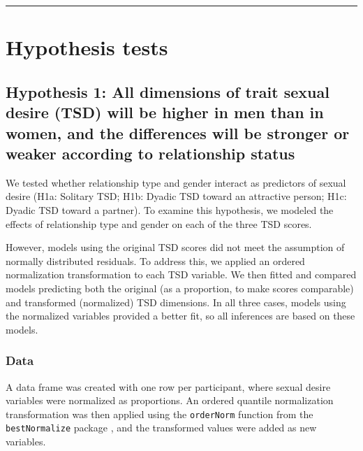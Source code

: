 \documentclass[
  bookmarksnumbered]{article}
\begin{document}
\begin{center}\rule{0.5\linewidth}{0.5pt}\end{center}

\section{Hypothesis tests}\label{hypothesis-tests}

\subsection{Hypothesis 1: All dimensions of trait sexual desire (TSD) will be higher in men than in women, and the differences will be stronger or weaker according to relationship status}\label{hyp1}

We tested whether relationship type and gender interact as predictors of sexual desire (H1a: Solitary TSD; H1b: Dyadic TSD toward an attractive person; H1c: Dyadic TSD toward a partner). To examine this hypothesis, we modeled the effects of relationship type and gender on each of the three TSD scores.

However, models using the original TSD scores did not meet the assumption of normally distributed residuals. To address this, we applied an ordered normalization transformation to each TSD variable. We then fitted and compared models predicting both the original (as a proportion, to make scores comparable) and transformed (normalized) TSD dimensions. In all three cases, models using the normalized variables provided a better fit, so all inferences are based on these models.

\subsubsection{Data}\label{data}

A data frame was created with one row per participant, where sexual desire variables were normalized as proportions. An ordered quantile normalization transformation \autocite{petersonOrderedQuantileNormalization2020a} was then applied using the \texttt{orderNorm} function from the \texttt{bestNormalize} package \autocite{bestNormalizecit}, and the transformed values were added as new variables.
\end{document}

